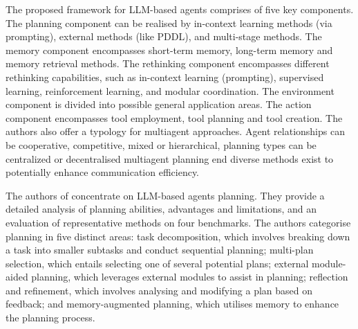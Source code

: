 \documentclass{article}
\begin{document}
The proposed framework for LLM-based agents comprises of five key components. The planning component can be realised by in-context learning methods (via prompting), external methods (like PDDL), and multi-stage methods. The memory component encompasses short-term memory, long-term memory and memory retrieval methods. The rethinking component encompasses different rethinking capabilities, such as in-context learning (prompting), supervised learning, reinforcement learning, and modular coordination. The environment component is divided into possible general application areas. The action component encompasses tool employment, tool planning and tool creation. The authors also offer a typology for multiagent approaches. Agent relationships can be cooperative, competitive, mixed or hierarchical, planning types can be centralized or decentralised multiagent planning end diverse methods exist to potentially enhance communication efficiency. 

The authors of \cite{huang_understanding_2024} concentrate on LLM-based agents planning. They provide a detailed analysis of planning abilities, advantages and limitations, and an evaluation of representative methods on four benchmarks. The authors categorise planning in five distinct areas: task decomposition, which involves breaking down a task into smaller subtasks and conduct sequential planning; multi-plan selection, which entails selecting one of several potential plans; external module-aided planning, which leverages external modules to assist in planning; reflection and refinement, which involves analysing and modifying a plan based on feedback; and memory-augmented planning, which utilises memory to enhance the planning process.

\end{document}
